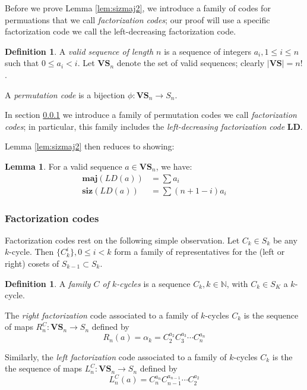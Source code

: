 \documentclass{amsart}[12pt]
\theoremstyle{definition}
\newtheorem{lemma}[dummy]{Lemma}
\newtheorem{definition}[dummy]{Definition}
\newcommand{\N}{\mathbb{N}}
\newcommand{\maj}{\mathbf{maj}}
\newcommand{\siz}{\mathbf{siz}}
\newcommand{\LD}{\mathbf{LD}}
\newcommand{\VS}{\mathbf{VS}}
\begin{document}
Before we prove Lemma \ref{lem:sizmaj2}, we introduce a family of codes for permuations that we call \emph{factorization codes}; our proof will use a specific factorization code we call the left-decreasing factorization code.

\begin{definition}
A \emph{valid sequence of length $n$} is a sequence of integers $a_i, 1\leq i\leq n $ such that $0\leq a_i<i$.  Let $\VS_n$ denote the set of valid sequences; clearly $|\VS|=n!$.

A \emph{permutation code} is a bijection $\phi:\VS_n\to S_n$.
\end{definition}

In section \ref{sec:factorization} we introduce a family of permutation codes we call \emph{factorization codes}; in particular, this family includes the \emph{left-decreasing factorization code} $\LD$.  

Lemma \ref{lem:sizmaj2} then reduces to showing:
\begin{lemma} \label{lem:LDweights}
For a valid sequence $a\in \VS_n$, we have:
\begin{align*}
\maj(LD(a))&=\sum a_i \\
\siz(LD(a))&=\sum (n+1-i) a_i
\end{align*}
\end{lemma}


\subsubsection{Factorization codes} \label{sec:factorization}

Factorization codes rest on the following simple observation.  Let $C_k\in S_k$ be any $k$-cycle.  Then $\{C_k^i\}, 0\leq i < k$ form a family of representatives for the (left or right) cosets of $S_{k-1}\subset S_k$.   

\begin{definition}
A \emph{family $C$ of $k$-cycles} is a sequence $C_k, k\in \N$, with $C_k\in S_K$ a $k$-cycle.

The \emph{right factorization} code associated to a family of $k$-cycles $C_k$ is the sequence of maps $R^C_n:\VS_n\to S_n$ defined by
$$R_n(a)=\alpha_k=C_2^{a_2}C_3^{a_3}\cdots C_n^{a_n}$$

Similarly, the \emph{left factorization} code associated to a family of $k$-cycles $C_k$ is the the sequence of maps $L^C_n:\VS_n\to S_n$ defined by
$$L^C_n(a)=C_n^{a_n}C_{n-1}^{a_{n-1}}\cdots C_2^{a_2}$$
\end{definition}
\end{document}
